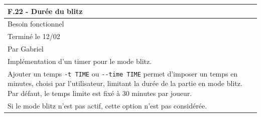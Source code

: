 \documentclass[a4paper,12pt]{article}
\begin{document}
\vspace{1cm}

\noindent
\setlength{\arrayrulewidth}{1.5pt}
\renewcommand{\arraystretch}{1.5}
\begin{tabularx}{\textwidth}{|X|}
    \hline
    \textbf{F.22 - Durée du blitz}                                                                                                                                                                                                                 \\
    \hline
    Besoin fonctionnel                                                                                                                                                                                                                             \\
    \hline
    Terminé le 12/02                                                                                                                                                                                                                               \\
    Par Gabriel                                                                                                                                                                                                                                    \\
    \hline
    Implémentation d’un timer pour le mode blitz.                                                                                                                                                                                                  \\
    Ajouter un temps \texttt{-t TIME} ou \texttt{-}\texttt{-time TIME} permet d’imposer un temps en minutes, choisi par l’utilisateur, limitant la durée de la partie en mode blitz. Par défaut, le temps limite est fixé à 30 minutes par joueur. \\
    Si le mode blitz n’est pas actif, cette option n’est pas considérée.                                                                                                                                                                           \\


\end{tabularx}
\end{document}
